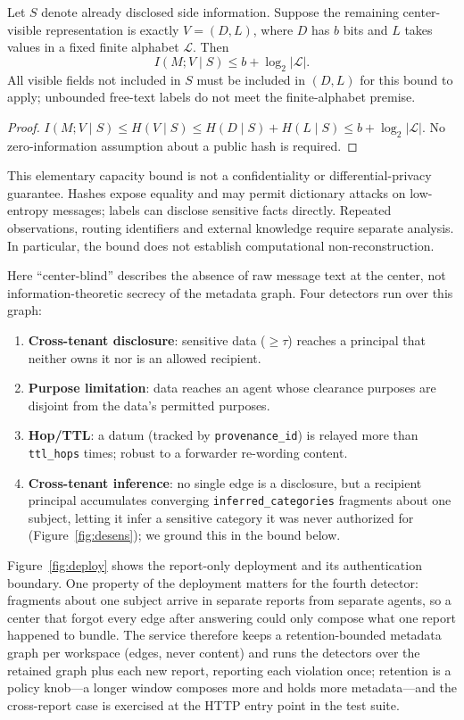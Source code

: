 \begin{lemma}\label{lem:blind}
Let $S$ denote already disclosed side information. Suppose the remaining
center-visible representation is exactly $V=(D,L)$, where $D$ has $b$ bits and
$L$ takes values in a fixed finite alphabet $\mathcal{L}$. Then
\[ I(M;V\mid S)\le b+\log_2|\mathcal{L}|. \]
All visible fields not included in $S$ must be included in $(D,L)$ for this
bound to apply; unbounded free-text labels do not meet the finite-alphabet premise.
\end{lemma}
\begin{proof}
$I(M;V\mid S)\le H(V\mid S)\le H(D\mid S)+H(L\mid S)
\le b+\log_2|\mathcal{L}|$. No zero-information assumption about a public
hash is required.
\end{proof}
This elementary capacity bound is not a confidentiality or differential-privacy
guarantee. Hashes expose equality and may permit dictionary attacks on low-entropy
messages; labels can disclose sensitive facts directly. Repeated observations,
routing identifiers and external knowledge require separate analysis. In
particular, the bound does not establish computational non-reconstruction.


Here ``center-blind'' describes the absence of raw message text at the center,
not information-theoretic secrecy of the metadata graph. Four detectors run
over this graph:
\begin{enumerate}[leftmargin=1.4em]
\item \textbf{Cross-tenant disclosure}: sensitive data ($\geq\tau$) reaches a
principal that neither owns it nor is an allowed recipient.
\item \textbf{Purpose limitation}: data reaches an agent whose clearance purposes
are disjoint from the data's permitted purposes.
\item \textbf{Hop/TTL}: a datum (tracked by \texttt{provenance\_id}) is relayed
more than \texttt{ttl\_hops} times; robust to a forwarder re-wording content.
\item \textbf{Cross-tenant inference}: no single edge is a disclosure, but a
recipient principal accumulates converging \texttt{inferred\_categories}
fragments about one subject, letting it infer a sensitive category it was never
authorized for (Figure~\ref{fig:desens}); we ground this in the bound below.
\end{enumerate}

Figure~\ref{fig:deploy} shows the report-only deployment and its authentication boundary. One property of the deployment matters for the fourth detector: fragments about one subject arrive in separate reports from separate agents, so a center that forgot every edge after answering could only compose what one report happened to bundle. The service therefore keeps a retention-bounded metadata graph per workspace (edges, never content) and runs the detectors over the retained graph plus each new report, reporting each violation once; retention is a policy knob---a longer window composes more and holds more metadata---and the cross-report case is exercised at the HTTP entry point in the test suite.




